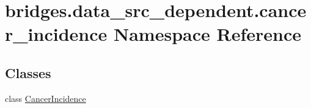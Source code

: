 \hypertarget{namespacebridges_1_1data__src__dependent_1_1cancer__incidence}{}\section{bridges.\+data\+\_\+src\+\_\+dependent.\+cancer\+\_\+incidence Namespace Reference}
\label{namespacebridges_1_1data__src__dependent_1_1cancer__incidence}
\subsection*{Classes}
\begin{DoxyCompactItemize}
\item 
class \mbox{\hyperlink{classbridges_1_1data__src__dependent_1_1cancer__incidence_1_1_cancer_incidence}{Cancer\+Incidence}}
\end{DoxyCompactItemize}
